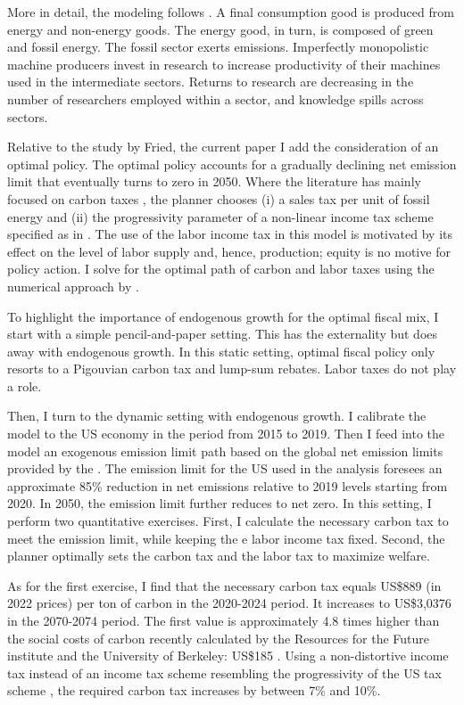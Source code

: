 More in detail, the modeling follows \cite{Fried2018ClimateAnalysis}. A final consumption good is produced from energy and non-energy goods. The energy good, in turn, is composed of green and fossil energy. The fossil sector exerts emissions. Imperfectly monopolistic machine producers invest in research to increase productivity of their machines used in the intermediate sectors. Returns to research are decreasing in the number of researchers employed within a sector, and knowledge spills across sectors.

Relative to the study by Fried, the current paper I add the consideration of an optimal policy. The optimal policy accounts for a gradually declining  net emission limit that eventually turns to zero in 2050. Where the literature  has mainly focused on carbon taxes \citep{Acemoglu2012TheChange, Fried2018ClimateAnalysis}, the planner chooses (i) a sales tax per unit of fossil energy and (ii) the progressivity parameter of a non-linear income tax scheme specified as in \cite{Heathcote2017OptimalFramework}. The use of the labor income tax in this model is motivated by its effect on the level of labor supply and, hence, production; equity is no motive for policy action.  I solve for the optimal path of carbon and labor taxes using the numerical approach by  \citep{Jones1993OptimalGrowth, Barrage2019OptimalPolicy}.

To highlight the importance of endogenous growth for the optimal fiscal mix, I start with a simple pencil-and-paper setting. This has the externality but does away with endogenous growth. In this static setting, optimal fiscal policy only resorts to a Pigouvian carbon tax and lump-sum rebates. Labor taxes do not play a role. 

Then, I turn to the dynamic setting with endogenous growth. I calibrate the model to the US economy in the period from 2015 to 2019. Then I feed into the model an exogenous emission limit path based on the global net emission limits provided by the \cite{IPCC2022}. The emission limit for the US used in the analysis foresees an approximate 85\% reduction in net emissions relative to 2019 levels starting from 2020. In 2050, the emission limit further reduces to net zero. In this setting, I perform two quantitative exercises. First, I calculate the necessary carbon tax to meet the emission limit, while keeping the e labor income tax fixed. Second,  the planner optimally sets the carbon tax and the labor tax to maximize welfare.

As for the first exercise, I find that the necessary carbon tax equals US\$889 (in 2022 prices) per ton of carbon in the 2020-2024 period. It increases to US\$3,0376 in the 2070-2074 period. The first value is approximately 4.8 times higher than the social costs of carbon recently calculated by the Resources for the Future institute and the University of Berkeley: US\$185 \citep{RFF}. Using a non-distortive income tax instead of an income tax scheme resembling the progressivity of the US tax scheme \citep[taken from][]{Heathcote2017OptimalFramework},  the required carbon tax increases by between 7\% and 10\%.

